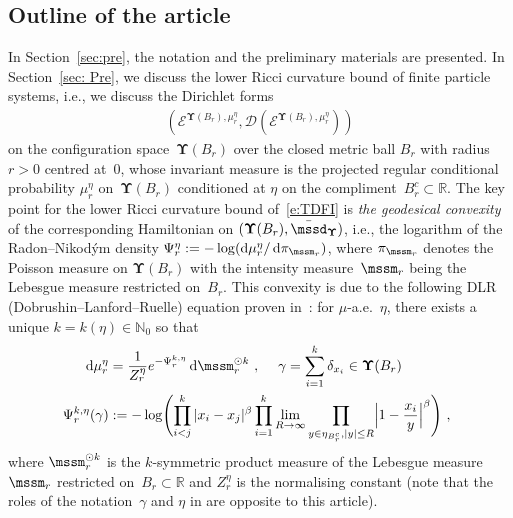 \documentclass[11pt,letterpaper]{amsart}
\newcommand{\dom}[1]{\mathcal D(#1)}
\newcommand{\diff}{\mathop{}\!\mathrm{d}}
\newcommand{\N}{{\mathbb N}}
\newcommand{\R}{{\mathbb R}}
\newcommand{\comma}{\,\,\mathrm{,}\;\,}
\newcommand{\QP}{{\mu}}
\newcommand{\dUpsilon}{{\mathbf \Upsilon}}
\newcommand{\U}{\dUpsilon}
\newcommand{\E}{\mathcal E}
\renewcommand{\1}{\mathbf 1}
\numberwithin{equation}{section}
\theoremstyle{plain}
\theoremstyle{definition}
\theoremstyle{remark}
\begin{document}
\subsection*{Outline of the article}
In Section~\ref{sec:pre}, the notation and the preliminary materials are presented. In Section~\ref{sec: Pre}, we discuss the lower Ricci curvature bound of finite particle systems, i.e., we discuss the Dirichlet forms 
\begin{align}\label{e:TDFI}
(\E^{\U(B_r), \QP_r^\eta}, \dom{\E^{\U(B_r), \QP_r^\eta}})
\end{align} on the configuration space~$\U(B_r)$ over the closed metric ball $B_r$ with radius $r>0$ centred at~$0$, whose invariant measure is the projected regular conditional probability $\QP_r^\eta$ on~$\U(B_r)$ conditioned at $\eta$ on the compliment~$B^c_r \subset \R$. The key point for the lower Ricci curvature bound of~\eqref{e:TDFI} is {\it the geodesical convexity} of the corresponding Hamiltonian on $(\U(B_r), \bar{\mssd}_\U)$, i.e., the logarithm of the Radon--Nikod\'ym density $\Psi_{r}^{\eta}:=-\log(\diff \mu_r^\eta/\diff \pi_{\mssm_r})$, where  $\pi_{\mssm_r}$ denotes the Poisson measure  on $\U(B_r)$ with the intensity measure~$\mssm_r$ being the Lebesgue measure restricted on~$B_r$.  This convexity is due to the following DLR (Dobrushin--Lanford--Ruelle) equation proven in~\cite[Thm.1.1]{DerHarLebMai20}: for $\mu$-a.e.~$\eta$, there exists a unique $k=k(\eta) \in \N_0$ so that  
\begin{align*} %
\diff\mu_r^\eta&%
=\frac{1}{Z_{r}^{\eta}} e^{-\Psi_{r}^{k, \eta}} \diff \mssm_r^{\odot k} \comma \quad \gamma=\sum_{i=1}^k \delta_{x_i} \in \U(B_r)
\\ 
 \Psi_{r}^{k, \eta}(\gamma) &:= - \log \Biggl(  \prod_{i<j}^k |x_i-x_j|^\beta \prod_{i=1}^k\lim_{R \to \infty}\prod_{y \in \eta_{B_r^c}, |y| \le R} \Bigl|1-\frac{x_i}{y}\Bigr|^\beta \Biggr) \comma \notag
\end{align*}
where $\mssm_r^{\odot k}$ is the $k$-symmetric product measure of the Lebesgue measure $\mssm_r$ restricted on~$B_r \subset \R$
and $Z_{r}^{\eta}$ is the normalising constant (note that the roles of the notation~$\gamma$ and $\eta$ in \cite{DerHarLebMai20} are opposite to this article). 
\end{document}

